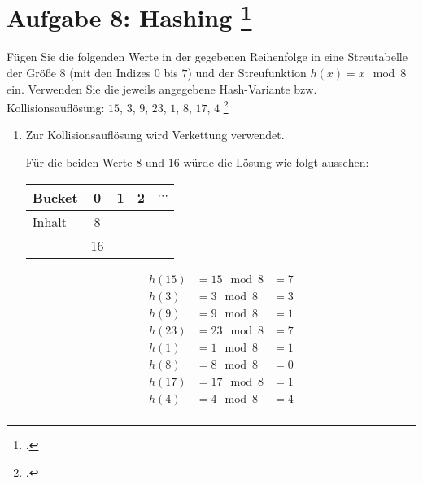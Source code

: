 \documentclass{lehramt-informatik-aufgabe}
\begin{document}

\section{Aufgabe 8: Hashing
\footcite[Thema 2 Aufgabe 1 (Auszug)]{examen:46115:2015:09}
}

Fügen Sie die folgenden Werte in der gegebenen Reihenfolge in eine
Streutabelle der Größe $8$ (mit den Indizes $0$ bis $7$) und der
Streufunktion $h(x) = x \mod 8$ ein. Verwenden Sie die jeweils angegebene
Hash-Variante bzw. Kollisionsauflösung: $15$, $3$, $9$, $23$, $1$, $8$,
$17$, $4$
\footcite[entnommen aus Algorithmen und
Datenstrukturen, Übungsblatt 5, Universität Würzburg]{aud:pu:7}

\begin{enumerate}


\item {}

Zur Kollisionsauflösung wird Verkettung
verwendet.


Für die beiden Werte $8$ und $16$ würde die Lösung wie folgt aussehen:

\begin{center}
\begin{tabular}{l|cccc}
Bucket    & 0  & 1      & 2 & $\cdots$ \\\hline
Inhalt    & 8 \\
          & 16 \\
\end{tabular}
\end{center}

\begin{antwort}
{\footnotesize
\begin{equation*}
\begin{aligned}
h(15) &= 15 \mod 8 &= 7\\
h(3)  &= 3 \mod 8  &= 3\\
h(9)  &= 9 \mod 8  &= 1\\
h(23) &= 23 \mod 8 &= 7\\
h(1)  &= 1 \mod 8  &= 1\\
h(8)  &= 8 \mod 8  &= 0\\
h(17) &= 17 \mod 8 &= 1\\
h(4)  &= 4 \mod 8  &= 4\\
\end{aligned}
\end{equation*}}


\end{antwort}
\end{enumerate}
\end{document}
